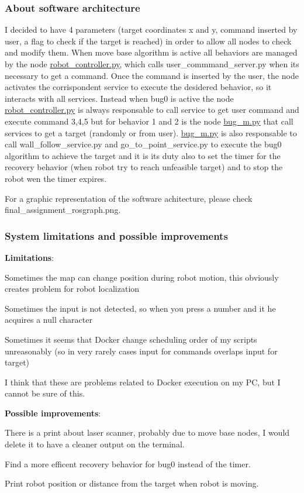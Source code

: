 \subsubsection*{About software architecture}

I decided to have 4 parameters (target coordinates x and y, command inserted by user, a flag to check if the target is reached) in order to allow all nodes to check and modify them. When move base algorithm is active all behaviors are managed by the node \hyperlink{robot__controller_8py}{robot\+\_\+controller.\+py}, which calls user\+\_\+commmand\+\_\+server.\+py when it\textquotesingle{}s necessary to get a command. Once the command is inserted by the user, the node activates the corrispondent service to execute the desidered behavior, so it interacts with all services. Instead when bug0 is active the node \hyperlink{robot__controller_8py}{robot\+\_\+controller.\+py} is always responsable to call service to get user command and execute command 3,4,5 but for behavior 1 and 2 is the node \hyperlink{bug__m_8py}{bug\+\_\+m.\+py} that call services to get a target (randomly or from user). \hyperlink{bug__m_8py}{bug\+\_\+m.\+py} is also responsable to call wall\+\_\+follow\+\_\+service.\+py and go\+\_\+to\+\_\+point\+\_\+service.\+py to execute the bug0 algorithm to achieve the target and it is its duty also to set the timer for the recovery behavior (when robot try to reach unfeasible target) and to stop the robot wen the timer expires.

For a graphic representation of the software achitecture, please check final\+\_\+assignment\+\_\+rosgraph.\+png.

\subsubsection*{System limitations and possible improvements}

{\bfseries Limitations}\+:
\begin{DoxyItemize}
\item Sometimes the map can change position during robot motion, this obviously creates problem for robot localization
\item Sometimes the input is not detected, so when you press a number and it he acquires a null character
\item Sometimes it seems that Docker change scheduling order of my scripts unreasonably (so in very rarely cases input for commands overlaps input for target)
\end{DoxyItemize}

I think that these are problems related to Docker execution on my PC, but I cannot be sure of this.

{\bfseries Possible improvements}\+:
\begin{DoxyItemize}
\item There is a print about laser scanner, probably due to move base nodes, I would delete it to have a cleaner output on the terminal.
\item Find a more efficent recovery behavior for bug0 instead of the timer.
\item Print robot position or distance from the target when robot is moving. 
\end{DoxyItemize}